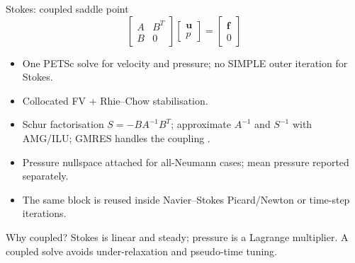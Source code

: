 \documentclass[aspectratio=169,10pt]{beamer}
\begin{document}
\begin{frame}{Stokes: coupled saddle point}
  \small
  \[
    \begin{bmatrix}
      A & B^{T}\\
      B & 0
    \end{bmatrix}
    \begin{bmatrix}
      \mathbf{u}\\ p
    \end{bmatrix}
    =
    \begin{bmatrix}
      \mathbf{f}\\ 0
    \end{bmatrix}
  \]
  \begin{itemize}
    \item One PETSc solve for velocity and pressure; no SIMPLE outer iteration
          for Stokes.
    \item Collocated FV + Rhie--Chow \cite{rhieChow1983} stabilisation.
    \item Schur factorisation
          $S=-BA^{-1}B^{T}$; approximate $A^{-1}$ and $S^{-1}$ with
          AMG/ILU; GMRES handles the coupling \cite{benzi2005,elman2014}.
    \item Pressure nullspace attached for all-Neumann cases; mean pressure
          reported separately.
    \item The same block is reused inside Navier--Stokes Picard/Newton or
          time-step iterations.
  \end{itemize}

  \begin{block}{Why coupled?}
    Stokes is linear and steady; pressure is a Lagrange multiplier. A coupled
    solve avoids under-relaxation and pseudo-time tuning.
  \end{block}
\end{frame}
\end{document}
